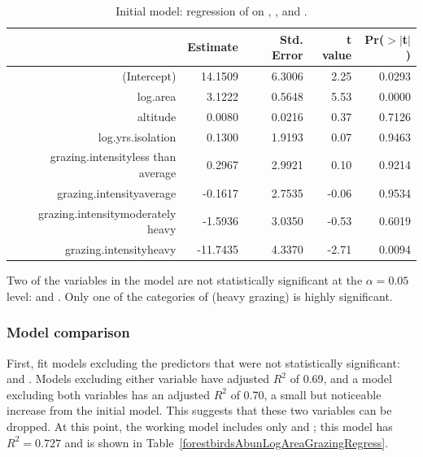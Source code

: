 \begin{table}[ht]
\centering
\begin{tabular}{rrrrr}
  \hline
 & Estimate & Std. Error & t value & Pr($>$$|$t$|$) \\ 
  \hline
(Intercept) & 14.1509 & 6.3006 & 2.25 & 0.0293 \\ 
  log.area & 3.1222 & 0.5648 & 5.53 & 0.0000 \\ 
  altitude & 0.0080 & 0.0216 & 0.37 & 0.7126 \\ 
  log.yrs.isolation & 0.1300 & 1.9193 & 0.07 & 0.9463 \\ 
  grazing.intensityless than average & 0.2967 & 2.9921 & 0.10 & 0.9214 \\ 
  grazing.intensityaverage & -0.1617 & 2.7535 & -0.06 & 0.9534 \\ 
  grazing.intensitymoderately heavy & -1.5936 & 3.0350 & -0.53 & 0.6019 \\ 
  grazing.intensityheavy & -11.7435 & 4.3370 & -2.71 & 0.0094 \\ 
   \hline
\end{tabular}
\caption{Initial model: regression of  on , ,  and .}
\label{forestbirdsAbunLogAreaAltLogIsolGrazingIntensityRegress}
\end{table}

Two of the variables in the model are not statistically significant at the $\alpha = 0.05$ level:  and . Only one of the categories of  (heavy grazing) is highly significant.

\subsubsection{Model comparison}

First, fit models excluding the predictors that were not statistically significant:  and . Models excluding either variable have adjusted $R^2$ of 0.69, and a model excluding both variables has an adjusted $R^2$ of 0.70, a small but noticeable increase from the initial model. This suggests that these two variables can be dropped. At this point, the working model includes only  and ; this model has $R^2 = 0.727$ and is shown in Table~\ref{forestbirdsAbunLogAreaGrazingRegress}. 

